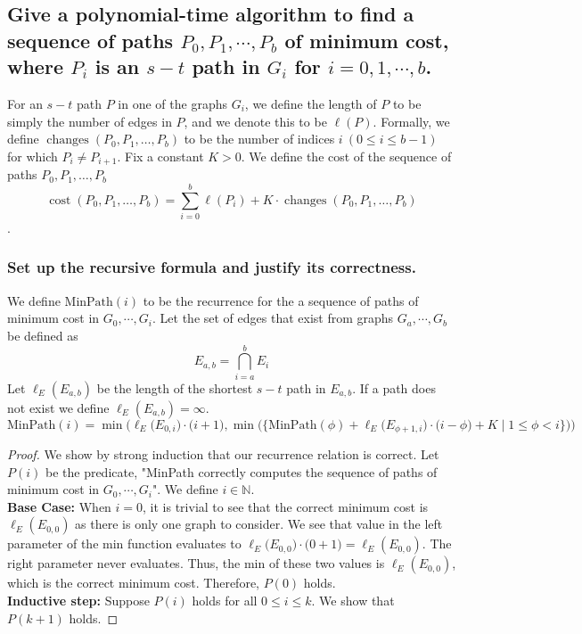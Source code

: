 \documentclass[11pt]{scrartcl}
\newcommand{\mpath}{\text{MinPath}}
\begin{document}
\subsection{
	Give a polynomial-time algorithm to find a sequence of paths
	$P_0, P_1, \cdots , P_b$ of minimum cost, where $P_i$ is an $s-t$ path in $G_i$ for
	$i = 0, 1, \cdots, b$.
}
For an $s-t$ path $P$ in one
of the graphs $G_i$, we define the length of $P$ to be simply the number of
edges in $P$, and we denote this to be $\ell(P)$.
Formally, we
define $\operatorname{changes}(P_{0}, P_{1}, \ldots, P_{b})$ to be the number of indices $i \ (0 \leq i \leq b - 1)$
for which $P_i \neq P_{i+1}$.
Fix a constant $K>0 .$ We define the cost of the sequence of paths
$P_{0}, P_{1}, \ldots, P_{b}$ 
\[
\operatorname{cost}\left(P_{0}, P_{1}, \ldots, P_{b}\right)=
\sum_{i=0}^{b} \ell\left(P_{i}\right)+K \cdot \operatorname{changes}\left(P_{0}, P_{1}, \ldots, P_{b}\right)
\].
\subsubsection{
	Set up the recursive formula and justify its correctness.
}

We define $\mpath(i)$ to be the recurrence for the a sequence of paths of minimum cost 
in $G_0, \cdots, G_i$. Let the set of edges that exist from graphs $G_a, \cdots, G_b$
be defined as 
$$E_{a,b} = \bigcap_{i=a}^{b} E_i$$
Let $\ell_E(E_{a,b})$ be the length of the shortest $s-t$ path in $E_{a,b}$. If a path does not exist 
we define $\ell_E(E_{a,b}) = \infty$.
$$
\mpath(i) = \min \Bigg(\ell_E\Big(E_{0,i}\Big) \cdot \Big(i+1\Big),
\min\Big(\Big\{\mpath(\phi)	+ \ell_E\Big(E_{\phi+1,i}\Big) \cdot \Big(i - \phi \Big)+ K \mid 1 \leq \phi < i\Big\}\Big) \Bigg)
$$


\begin{proof}
	We show by strong induction that our recurrence relation is correct. Let $P(i)$ be the predicate,
	"MinPath correctly computes the sequence of paths of minimum cost in $G_0, \cdots, G_i$". 
	We define $i \in \mathbb{N}$. \\
	\textbf{Base Case:} When $i=0$, it is trivial to see that the correct minimum cost is
	$\ell_E(E_{0,0})$ as there is only one graph to consider. We see that value in the left
	parameter of the min function evaluates to $\ell_E\big(E_{0,0}\big) \cdot \big(0+1\big) = \ell_E(E_{0,0})$.
	The right parameter never evaluates. Thus, the min of these two values is $\ell_E(E_{0,0})$,
	which is the correct minimum cost. Therefore, $P(0)$ holds.\\
	\textbf{Inductive step:} Suppose $P(i)$ holds for all $0 \leq i \leq k$. We show that $P(k + 1)$ holds.
\end{proof}
\end{document}
